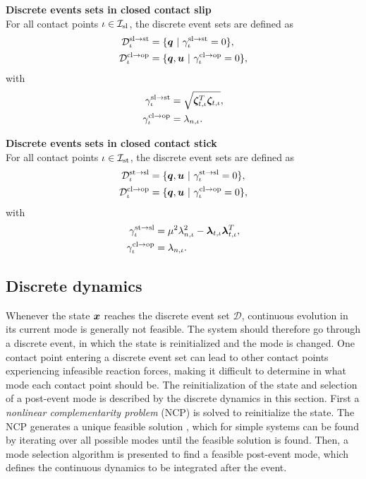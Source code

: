 \documentclass[../DC2017114Bouma.tex]{subfiles}
\begin{document}
\textbf{Discrete events sets in closed contact slip}\\
For all contact points $\iota\in\mathcal{I}_{\text{sl}}$, the discrete event sets are defined as
\begin{align}
\mathcal{D}^{\text{sl}\rightarrow\text{st}}_{\iota} &= \{ \qb\ |\ \gamma^{\text{sl}\rightarrow\text{st}}_{\iota} = 0\},\label{eq:2Dslst}\\
\mathcal{D}^{\text{cl}\rightarrow\text{op}}_{\iota} &= \{ \qb,\ub\ |\ \gamma^{\text{cl}\rightarrow\text{op}}_{\iota} = 0\},\label{eq:2Dslop}
\end{align}
with 
\begin{align}
\gamma^{\text{sl}\rightarrow\text{st}}_{\iota} &= \sqrt{\boldsymbol{\zeta}_{t,\iota}^T\boldsymbol{\zeta}_{t,\iota}},\\
\gamma^{\text{cl}\rightarrow\text{op}}_{\iota} &= \lambda_{n,\iota}.
\end{align}

\textbf{Discrete events sets in closed contact stick}\\
For all contact points $\iota\in\mathcal{I}_{\text{st}}$, the discrete event sets are defined as
\begin{align}
\mathcal{D}^{\text{st}\rightarrow\text{sl}}_{\iota} &= \{ \qb,\ub\ |\ \gamma^{\text{st}\rightarrow\text{sl}}_{\iota} = 0 \},\label{eq:2Dstsl}\\
\mathcal{D}^{\text{cl}\rightarrow\text{op}}_{\iota} &= \{ \qb,\ub\ |\ \gamma^{\text{cl}\rightarrow\text{op}}_{\iota} = 0 \},\label{eq:2Dstop}
\end{align}
with 
\begin{align}
\gamma^{\text{st}\rightarrow\text{sl}}_{\iota} &= \mu^2\lambda_{n,\iota}^2-\boldsymbol{\lambda}_{t,\iota}\boldsymbol{\lambda}_{t,\iota}^T,\\
\gamma^{\text{cl}\rightarrow\text{op}}_{\iota} &= \lambda_{n,\iota}.
\end{align}

\subsection{Discrete dynamics}\label{sec:2discdyn}
Whenever the state ${\boldsymbol{x}}$ reaches the discrete event set $\mathcal{D}$, continuous evolution in its current mode is generally not feasible. The system should therefore go through a discrete event, in which the state is reinitialized and the mode is changed. One contact point entering a discrete event set can lead to other contact points experiencing infeasible reaction forces, making it difficult to determine in what mode each contact point should be. The reinitialization of the state and selection of a post-event mode is described by the discrete dynamics in this section. First a \textit{nonlinear complementarity problem} (NCP) is solved to reinitialize the state. The NCP generates a unique feasible solution \cite{Delassus1917}, which for simple systems can be found by iterating over all possible modes until the feasible solution is found. Then, a mode selection algorithm is presented to find a feasible post-event mode, which defines the continuous dynamics to be integrated after the event. 
%
\end{document}
